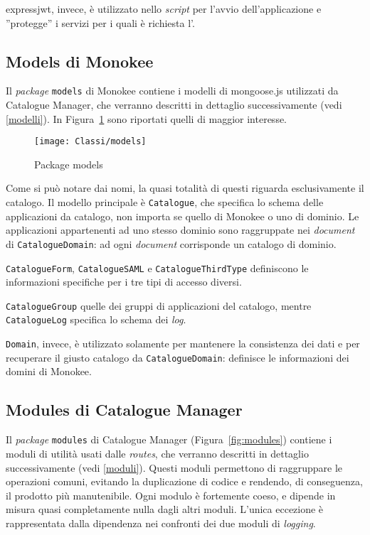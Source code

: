 expressjwt, invece, è utilizzato nello \textit{script} per l'avvio dell'applicazione e ''protegge'' i servizi per i quali è richiesta l'. 

\subsection{Models di Monokee}
Il \textit{package} \texttt{models} di Monokee contiene i modelli di mongoose.js utilizzati da Catalogue Manager, che verranno descritti in dettaglio successivamente (vedi \ref{modelli}). In Figura~\ref{fig:models} sono riportati quelli di maggior interesse.

\begin{figure}[hbpc]
  \begin{center}
    \texttt{[image: Classi/models]}
  \caption[Package models]{Package models}
  \label{fig:models}
  \end{center} 
\end{figure}

Come si può notare dai nomi, la quasi totalità di questi riguarda esclusivamente il catalogo. Il modello principale è \texttt{Catalogue}, che specifica lo schema delle applicazioni da catalogo, non importa se quello di Monokee o uno di dominio. Le applicazioni appartenenti ad uno stesso dominio sono raggruppate nei \textit{document} di \texttt{CatalogueDomain}: ad ogni \textit{document} corrisponde un catalogo di dominio.

\texttt{CatalogueForm}, \texttt{CatalogueSAML} e \texttt{CatalogueThirdType} definiscono le informazioni specifiche per i tre tipi di accesso diversi.

\texttt{CatalogueGroup} quelle dei gruppi di applicazioni del catalogo, mentre \texttt{CatalogueLog} specifica lo schema dei \textit{log}.

\texttt{Domain}, invece, è utilizzato solamente per mantenere la consistenza dei dati e per recuperare il giusto catalogo da \texttt{CatalogueDomain}: definisce le informazioni dei domini di Monokee.

\subsection{Modules di Catalogue Manager}
Il \textit{package} \texttt{modules} di Catalogue Manager (Figura~\ref{fig:modules}) contiene i moduli di utilità usati dalle \textit{routes}, che verranno descritti in dettaglio successivamente (vedi \ref{moduli}).  Questi moduli permettono di raggruppare le operazioni comuni, evitando la duplicazione di codice e rendendo, di conseguenza, il prodotto più manutenibile. Ogni modulo è fortemente coeso, e dipende in misura quasi completamente nulla dagli altri moduli. L'unica eccezione è rappresentata dalla dipendenza nei confronti dei due moduli di \textit{logging}.

